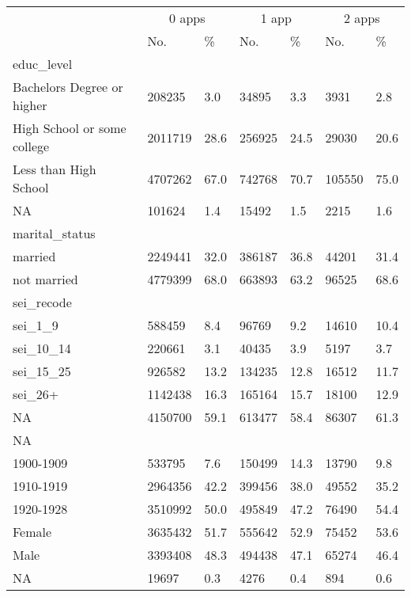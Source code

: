 \captionsetup[table]{labelformat=empty,skip=1pt}
\begin{longtable}{lllllll}
\toprule
& \multicolumn{2}{c}{0 apps} & \multicolumn{2}{c}{1 app} & \multicolumn{2}{c}{2 apps} \\ 
 \cmidrule(lr){2-3}\cmidrule(lr){4-5}\cmidrule(lr){6-7}
 & No. & \% & No. & \% & No. & \% \\ 
\midrule
\multicolumn{1}{l}{educ\_level} \\ 
\midrule
Bachelors Degree or higher & 208235 & 3.0 & 34895 & 3.3 & 3931 & 2.8 \\ 
High School or some college & 2011719 & 28.6 & 256925 & 24.5 & 29030 & 20.6 \\ 
Less than High School & 4707262 & 67.0 & 742768 & 70.7 & 105550 & 75.0 \\ 
NA & 101624 & 1.4 & 15492 & 1.5 & 2215 & 1.6 \\ 
\midrule
\multicolumn{1}{l}{marital\_status} \\ 
\midrule
married & 2249441 & 32.0 & 386187 & 36.8 & 44201 & 31.4 \\ 
not married & 4779399 & 68.0 & 663893 & 63.2 & 96525 & 68.6 \\ 
\midrule
\multicolumn{1}{l}{sei\_recode} \\ 
\midrule
sei\_1\_9 & 588459 & 8.4 & 96769 & 9.2 & 14610 & 10.4 \\ 
sei\_10\_14 & 220661 & 3.1 & 40435 & 3.9 & 5197 & 3.7 \\ 
sei\_15\_25 & 926582 & 13.2 & 134235 & 12.8 & 16512 & 11.7 \\ 
sei\_26+ & 1142438 & 16.3 & 165164 & 15.7 & 18100 & 12.9 \\ 
NA & 4150700 & 59.1 & 613477 & 58.4 & 86307 & 61.3 \\ 
\midrule
\multicolumn{1}{l}{NA} \\ 
\midrule
1900-1909 & 533795 & 7.6 & 150499 & 14.3 & 13790 & 9.8 \\ 
1910-1919 & 2964356 & 42.2 & 399456 & 38.0 & 49552 & 35.2 \\ 
1920-1928 & 3510992 & 50.0 & 495849 & 47.2 & 76490 & 54.4 \\ 
Female & 3635432 & 51.7 & 555642 & 52.9 & 75452 & 53.6 \\ 
Male & 3393408 & 48.3 & 494438 & 47.1 & 65274 & 46.4 \\ 
NA & 19697 & 0.3 & 4276 & 0.4 & 894 & 0.6 \\ 
\bottomrule
\end{longtable}

